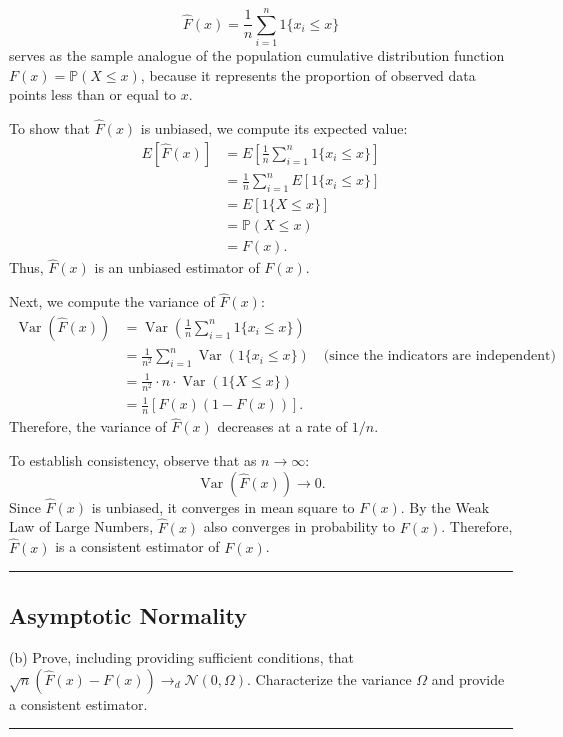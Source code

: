 \documentclass{article}
\newenvironment{colorparagraph}[1]{\par\color{#1}}{\par}
\begin{document}
\[
\hat{F}(x) = \frac{1}{n} \sum_{i=1}^n 1\{ x_i \leq x \}
\]
serves as the sample analogue of the population cumulative distribution function \( F(x) = \mathbb{P}(X \leq x) \), because it represents the proportion of observed data points less than or equal to \( x \).

To show that \( \hat{F}(x) \) is unbiased, we compute its expected value:
\[
\begin{aligned}
E[\hat{F}(x)] &= E\left[ \frac{1}{n} \sum_{i=1}^n 1\{ x_i \leq x \} \right] \\
&= \frac{1}{n} \sum_{i=1}^n E[1\{ x_i \leq x \}] \\
&= E[1\{ X \leq x \}] \\
&= \mathbb{P}(X \leq x) \\
&= F(x).
\end{aligned}
\]
Thus, \( \hat{F}(x) \) is an unbiased estimator of \( F(x) \).

Next, we compute the variance of \( \hat{F}(x) \):
\[
\begin{aligned}
\operatorname{Var}(\hat{F}(x)) &= \operatorname{Var}\left( \frac{1}{n} \sum_{i=1}^n 1\{ x_i \leq x \} \right) \\
&= \frac{1}{n^2} \sum_{i=1}^n \operatorname{Var}(1\{ x_i \leq x \}) \quad \text{(since the indicators are independent)} \\
&= \frac{1}{n^2} \cdot n \cdot \operatorname{Var}(1\{ X \leq x \}) \\
&= \frac{1}{n} \left[ F(x)(1 - F(x)) \right].
\end{aligned}
\]
Therefore, the variance of \( \hat{F}(x) \) decreases at a rate of \( 1/n \).

To establish consistency, observe that as \( n \to \infty \):
\[
\operatorname{Var}(\hat{F}(x)) \to 0.
\]
Since \( \hat{F}(x) \) is unbiased, it converges in mean square to \( F(x) \). By the Weak Law of Large Numbers, \( \hat{F}(x) \) also converges in probability to \( F(x) \). Therefore, \( \hat{F}(x) \) is a consistent estimator of \( F(x) \).

\begin{colorparagraph}{questioncolor}
\label{q2b}
\rule{\textwidth}{0.5pt}
\subsection{Asymptotic Normality}
(b) Prove, including providing sufficient conditions, that \( \sqrt{n}(\hat{F}(x) - F(x)) \to_d \mathcal{N}(0, \Omega) \).
Characterize the variance \( \Omega \) and provide a consistent estimator.

\rule{\textwidth}{0.5pt}
\end{colorparagraph}
\end{document}
